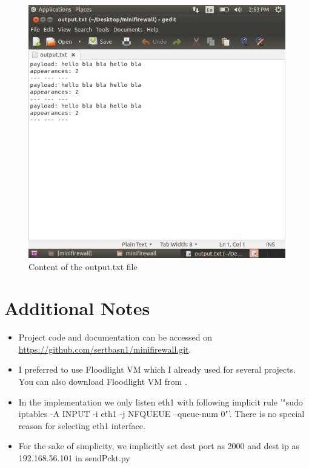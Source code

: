 \documentclass[paper=a4, fontsize=11pt]{scrartcl}
\numberwithin{equation}{section}		%
\numberwithin{figure}{section}			%
\numberwithin{table}{section}				%
\begin{document}
\begin{figure}[H]
\centering
\includegraphics[width=\textwidth]{img/output.png}
\caption{Content of the output.txt file}
\end{figure}

\newpage
\section*{Additional Notes}
\begin{itemize}
\item Project code and documentation can be accessed on \url{https://github.com/sertbasn1/minifirewall.git}.
\item I preferred to use Floodlight VM which I already used for several projects. You can also download Floodlight VM from \cite{r4}.
\item In the implementation we only listen eth1 with following implicit rule '"sudo iptables -A INPUT -i eth1 -j NFQUEUE --queue-num 0"'. There is no special reason for selecting eth1 interface.
\item For the sake of simplicity, we implicitly set dest port as 2000 and dest ip as 192.168.56.101 in sendPckt.py
\end{itemize}

\printbibliography
\end{document}
